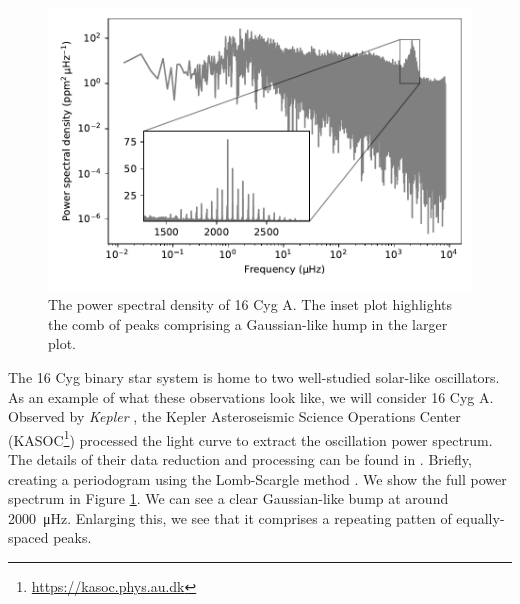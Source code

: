 \begin{figure}[tb]
    \centering
    \includegraphics{figures/seismo-psd.pdf}
    \caption{The power spectral density of 16 Cyg A. The inset plot highlights the comb of peaks comprising a Gaussian-like hump in the larger plot.}
    \label{fig:seismo-psd}
\end{figure}

The 16 Cyg binary star system is home to two well-studied solar-like oscillators. As an example of what these observations look like, we will consider 16 Cyg A. Observed by \emph{Kepler} , the Kepler Asteroseismic Science Operations Center (KASOC\footnote{\url{https://kasoc.phys.au.dk}}) processed the light curve to extract the oscillation power spectrum. The details of their data reduction and processing can be found in \needcite. Briefly, creating a periodogram using the Lomb-Scargle method \citep{Lomb1976,Scargle1982}. We show the full power spectrum in Figure \ref{fig:seismo-psd}. We can see a clear Gaussian-like bump at around \SI{2000}{\micro\hertz}. Enlarging this, we see that it comprises a repeating patten of equally-spaced peaks.


